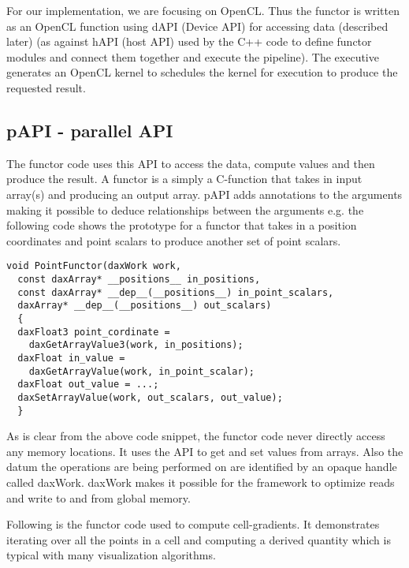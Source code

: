 \documentclass{vgtc}                          %
\begin{document}
For our implementation, we are focusing on OpenCL. Thus the functor is written
as an OpenCL function using dAPI (Device API) for accessing data (described
later) (as against hAPI (host API) used by the C++ code to define functor
modules and connect them together and execute the pipeline). The executive
generates an OpenCL kernel to schedules the kernel for execution to produce the
requested result.

\subsection{pAPI - parallel API}

The functor code uses this API to access the data, compute values and then
produce the result. A functor is a simply a C-function that takes in input
array(s) and producing an output array. pAPI adds annotations to the arguments
making it possible to deduce relationships between the arguments e.g. the
following code shows the prototype for a functor that takes in a position
coordinates and point scalars to produce another set of point scalars.

\small{
\begin{verbatim}
void PointFunctor(daxWork work,
  const daxArray* __positions__ in_positions,
  const daxArray* __dep__(__positions__) in_point_scalars,
  daxArray* __dep__(__positions__) out_scalars)
  {
  daxFloat3 point_cordinate =
    daxGetArrayValue3(work, in_positions);
  daxFloat in_value =
    daxGetArrayValue(work, in_point_scalar);
  daxFloat out_value = ...;
  daxSetArrayValue(work, out_scalars, out_value);
  }
\end{verbatim}
}

As is clear from the above code snippet, the functor code never directly access
any memory locations. It uses the API to get and set values from arrays. Also
the datum the operations are being performed on are identified by an opaque
handle called daxWork. daxWork makes it possible for the framework to optimize
reads and write to and from global memory.

Following is the functor code used to compute cell-gradients. It demonstrates
iterating over all the points in a cell and computing a derived quantity which
is typical with many visualization algorithms.
\end{document}
